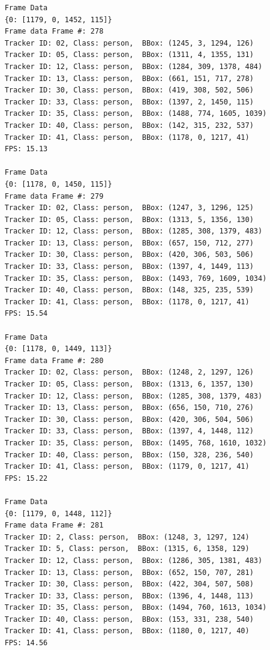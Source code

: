 \documentclass{fisatprojectfinal}
\begin{document}
\begin{verbatim}
    Frame Data
    {0: [1179, 0, 1452, 115]}
    Frame data Frame #: 278
    Tracker ID: 02, Class: person,  BBox: (1245, 3, 1294, 126)
    Tracker ID: 05, Class: person,  BBox: (1311, 4, 1355, 131)
    Tracker ID: 12, Class: person,  BBox: (1284, 309, 1378, 484)
    Tracker ID: 13, Class: person,  BBox: (661, 151, 717, 278)
    Tracker ID: 30, Class: person,  BBox: (419, 308, 502, 506)
    Tracker ID: 33, Class: person,  BBox: (1397, 2, 1450, 115)
    Tracker ID: 35, Class: person,  BBox: (1488, 774, 1605, 1039)
    Tracker ID: 40, Class: person,  BBox: (142, 315, 232, 537)
    Tracker ID: 41, Class: person,  BBox: (1178, 0, 1217, 41)
    FPS: 15.13
    
    Frame Data
    {0: [1178, 0, 1450, 115]}
    Frame data Frame #: 279
    Tracker ID: 02, Class: person,  BBox: (1247, 3, 1296, 125)
    Tracker ID: 05, Class: person,  BBox: (1313, 5, 1356, 130)
    Tracker ID: 12, Class: person,  BBox: (1285, 308, 1379, 483)
    Tracker ID: 13, Class: person,  BBox: (657, 150, 712, 277)
    Tracker ID: 30, Class: person,  BBox: (420, 306, 503, 506)
    Tracker ID: 33, Class: person,  BBox: (1397, 4, 1449, 113)
    Tracker ID: 35, Class: person,  BBox: (1493, 769, 1609, 1034)
    Tracker ID: 40, Class: person,  BBox: (148, 325, 235, 539)
    Tracker ID: 41, Class: person,  BBox: (1178, 0, 1217, 41)
    FPS: 15.54
    
    Frame Data
    {0: [1178, 0, 1449, 113]}
    Frame data Frame #: 280
    Tracker ID: 02, Class: person,  BBox: (1248, 2, 1297, 126)
    Tracker ID: 05, Class: person,  BBox: (1313, 6, 1357, 130)
    Tracker ID: 12, Class: person,  BBox: (1285, 308, 1379, 483)
    Tracker ID: 13, Class: person,  BBox: (656, 150, 710, 276)
    Tracker ID: 30, Class: person,  BBox: (420, 306, 504, 506)
    Tracker ID: 33, Class: person,  BBox: (1397, 4, 1448, 112)
    Tracker ID: 35, Class: person,  BBox: (1495, 768, 1610, 1032)
    Tracker ID: 40, Class: person,  BBox: (150, 328, 236, 540)
    Tracker ID: 41, Class: person,  BBox: (1179, 0, 1217, 41)
    FPS: 15.22
    
    Frame Data
    {0: [1179, 0, 1448, 112]}
    Frame data Frame #: 281
    Tracker ID: 2, Class: person,  BBox: (1248, 3, 1297, 124)
    Tracker ID: 5, Class: person,  BBox: (1315, 6, 1358, 129)
    Tracker ID: 12, Class: person,  BBox: (1286, 305, 1381, 483)
    Tracker ID: 13, Class: person,  BBox: (652, 150, 707, 281)
    Tracker ID: 30, Class: person,  BBox: (422, 304, 507, 508)
    Tracker ID: 33, Class: person,  BBox: (1396, 4, 1448, 113)
    Tracker ID: 35, Class: person,  BBox: (1494, 760, 1613, 1034)
    Tracker ID: 40, Class: person,  BBox: (153, 331, 238, 540)
    Tracker ID: 41, Class: person,  BBox: (1180, 0, 1217, 40)
    FPS: 14.56
    

\end{verbatim}
\end{document}
